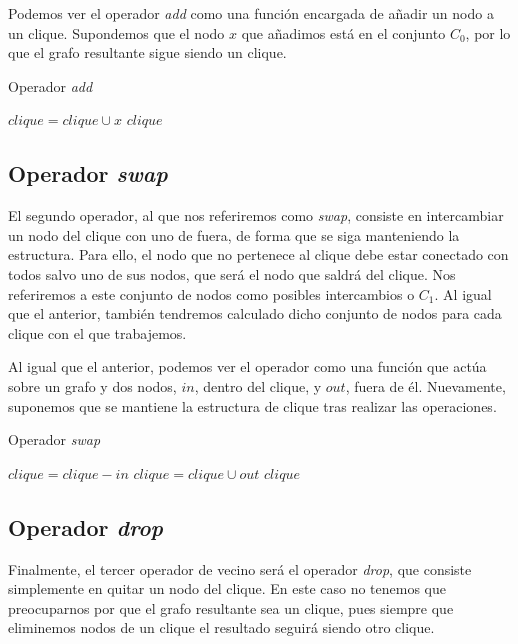 Podemos ver el operador \textit{add} como una función encargada de añadir un nodo a un clique.
Supondemos que el nodo $x$ que añadimos está en el conjunto $C_0$, por lo que el grafo resultante
sigue siendo un clique.

\begin{algorithm}[H]
\caption{Operador \textit{add}}
  \begin{algorithmic}
    \State $clique = clique \cup x$
    \Return $clique$
  \EndFunction
  \end{algorithmic}
\end{algorithm}


\subsection{Operador \textit{swap}}

El segundo operador, al que nos referiremos como \textit{swap}, consiste en intercambiar un
nodo del clique con uno de fuera, de forma que se siga manteniendo la estructura. Para ello,
el nodo que no pertenece al clique debe estar conectado con todos salvo uno de sus nodos,
que será el nodo que saldrá del clique. Nos referiremos a este conjunto de nodos como posibles
intercambios o $C_1$. Al igual que el anterior, también tendremos calculado dicho conjunto de
nodos para cada clique con el que trabajemos.

Al igual que el anterior, podemos ver el operador como una función que actúa sobre un grafo y
dos nodos, $in$, dentro del clique, y $out$, fuera de él. Nuevamente, suponemos que se mantiene
la estructura de clique tras realizar las operaciones.

\begin{algorithm}[H]
\caption{Operador \textit{swap}}
  \begin{algorithmic}
    \State $clique = clique - in$
    \State $clique = clique \cup out$
    \Return $clique$
  \EndFunction
  \end{algorithmic}
\end{algorithm}

\subsection{Operador \textit{drop}}

Finalmente, el tercer operador de vecino será el operador \textit{drop}, que consiste simplemente en quitar
un nodo del clique. En este caso no tenemos que preocuparnos por que el grafo resultante sea un clique,
pues siempre que eliminemos nodos de un clique el resultado seguirá siendo otro clique.

